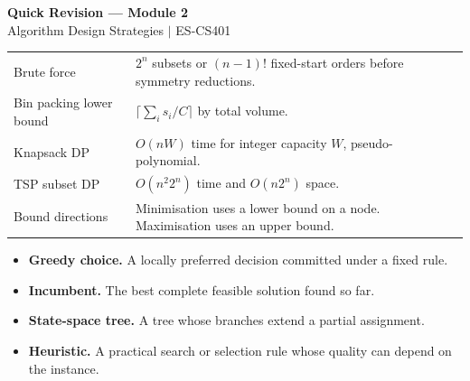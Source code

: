 \documentclass[12pt,a4paper]{article}
\renewcommand{\arraystretch}{1.45}
\begin{document}
\newpage
\begin{center}
  {\large\bfseries\color{myred} Quick Revision --- Module 2}\\[3pt]
  {\small\color{mydark} Algorithm Design Strategies $|$ ES-CS401}
\end{center}
\noindent{\color{myred}\rule{\linewidth}{1.2pt}}\par\vspace{4pt}

\begin{tcolorbox}[formulabox, title={Key Concepts at a Glance}]
\renewcommand{\arraystretch}{1.35}
\noindent\begin{tabularx}{\linewidth}{B{4.5cm}Y}
Brute force & $2^n$ subsets or $(n-1)!$ fixed-start orders before symmetry reductions. \\[3pt]
Bin packing lower bound & $\lceil\sum_i s_i/C\rceil$ by total volume. \\[3pt]
Knapsack DP & $O(nW)$ time for integer capacity $W$, pseudo-polynomial. \\[3pt]
TSP subset DP & $O(n^2 2^n)$ time and $O(n2^n)$ space. \\[3pt]
Bound directions & Minimisation uses a lower bound on a node. Maximisation uses an upper bound. \\[3pt]
\end{tabularx}\par
\end{tcolorbox}

\begin{tcolorbox}[defbox, title={One-Line Definitions}]
\begin{itemize}[leftmargin=*, itemsep=3pt, topsep=4pt]
  \item \textbf{Greedy choice.} A locally preferred decision committed under a fixed rule.
  \item \textbf{Incumbent.} The best complete feasible solution found so far.
  \item \textbf{State-space tree.} A tree whose branches extend a partial assignment.
  \item \textbf{Heuristic.} A practical search or selection rule whose quality can depend on the instance.
\end{itemize}
\end{tcolorbox}
\end{document}
